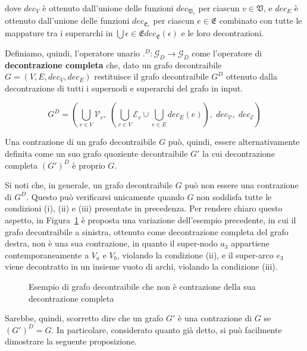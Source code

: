 dove $dec_V$ è ottenuto dall'unione delle funzioni $dec_{\mathfrak{V}_v}$ per ciascun $v \in \mathfrak{V}$,
e $dec_E$ è ottenuto dall'unione delle funzioni $dec_{\mathfrak{E}_e}$ per ciascun $e \in \mathfrak{E}$ combinato con
tutte le mappature tra i superarchi in $\bigcup{\epsilon \in \mathfrak{E}} dec_{\mathfrak{E}}(\epsilon)$ e le loro
decontrazioni. \newline

Definiamo, quindi, l'operatore unario $.^D : \mathcal{G}_D \rightarrow \mathcal{G}_D$ come l'operatore di
\textbf{decontrazione completa} che, dato un grafo decontraibile $G = (V, E, dec_V, dec_E)$ restituisce il grafo
decontraibile $G^D$ ottenuto dalla decontrazione di tutti i supernodi e superarchi del grafo in input.

\begin{equation*}
    G^D = (\bigcup_{v \in V} \mathcal{V}_v , \; (\bigcup_{v \in V} \mathcal{E}_v \cup \bigcup_{e \in E} dec_E(e)), \;
    dec_{\mathcal{V}}, \; dec_{\mathcal{E}})
\end{equation*}

Una contrazione di un grafo decontraibile $G$ pu\`o, quindi, essere alternativamente definita come un suo grafo
quoziente decontraibile $G'$ la cui decontrazione completa $(G')^D$ \`e proprio $G$.
\newline

Si noti che, in generale, un grafo decontraibile $G$ pu\`o non essere una contrazione di $G^D$.
Questo pu\`o verificarsi unicamente quando $G$ non soddisfa tutte le condizioni (i), (ii) e (iii) presentate in
precedenza. \newline
Per rendere chiaro questo aspetto, in Figura~\ref{fig:non-contraction-example} \`e proposta una variazione
dell'esempio precedente, in cui il grafo decontraibile a sinistra, ottenuto come decontrazione completa del grafo
destra, non \`e una sua contrazione, in quanto il super-nodo $a_3$ appartiene contemporaneamente a $V_a$ e $V_b$,
violando la condizione (ii), e il super-arco $e_3$ viene decontratto in un insieme vuoto di archi,
violando la condizione (iii).

\begin{figure}
    \centering
    
    \caption{Esempio di grafo decontraibile che non \`e contrazione della sua decontrazione completa}
    \label{fig:non-contraction-example}
\end{figure}

Sarebbe, quindi, scorretto dire che un grafo $G'$ \`e una contrazione di $G$ se $(G')^D = G$.
In particolare, considerato quanto gi\`a detto, si pu\`o facilmente dimostrare la seguente proposizione.

